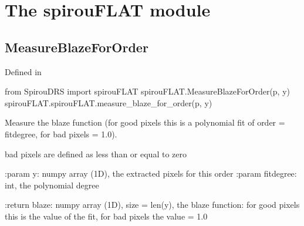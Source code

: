 
\clearpage
\newpage
\noindent\begin{minipage}{\textwidth}
\section{The spirouFLAT module}
\label{ch:the_module:spirouFLAT}

\subsection{MeasureBlazeForOrder}

Defined in \spirouFLAT{}

\begin{pythonbox}
from SpirouDRS import spirouFLAT
spirouFLAT.MeasureBlazeForOrder(p, y)
spirouFLAT.spirouFLAT.measure_blaze_for_order(p, y)
\end{pythonbox}

\begin{pythondocstring}
Measure the blaze function (for good pixels this is a polynomial fit of
order = fitdegree, for bad pixels = 1.0).

bad pixels are defined as less than or equal to zero

:param y: numpy array (1D), the extracted pixels for this order
:param fitdegree: int, the polynomial degree

:return blaze: numpy array (1D), size = len(y), the blaze function: for
               good pixels this is the value of the fit, for bad pixels the
               value = 1.0
\end{pythondocstring}
\end{minipage}



